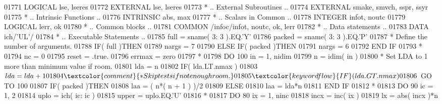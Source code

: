 \begin{DoxyCode}
01771       \textcolor{keywordtype}{LOGICAL}            lse, lseres
01772       \textcolor{keywordtype}{EXTERNAL}           lse, lseres
01773 \textcolor{comment}{*     .. External Subroutines ..}
01774       \textcolor{keywordtype}{EXTERNAL}           smake, smvch, sspr, ssyr
01775 \textcolor{comment}{*     .. Intrinsic Functions ..}
01776       \textcolor{keywordtype}{INTRINSIC}          abs, max
01777 \textcolor{comment}{*     .. Scalars in Common ..}
01778       \textcolor{keywordtype}{INTEGER}            infot, noutc
01779       \textcolor{keywordtype}{LOGICAL}            lerr, ok
01780 \textcolor{comment}{*     .. Common blocks ..}
01781       \textcolor{keyword}{COMMON}             /infoc/infot, noutc, ok, lerr
01782 \textcolor{comment}{*     .. Data statements ..}
01783       \textcolor{keyword}{DATA}               ich/\textcolor{stringliteral}{'UL'}/
01784 \textcolor{comment}{*     .. Executable Statements ..}
01785       full = sname( 3: 3 ).EQ.\textcolor{stringliteral}{'Y'}
01786       packed = sname( 3: 3 ).EQ.\textcolor{stringliteral}{'P'}
01787 \textcolor{comment}{*     Define the number of arguments.}
01788       \textcolor{keywordflow}{IF}( full )\textcolor{keywordflow}{THEN}
01789          nargs = 7
01790       \textcolor{keywordflow}{ELSE} \textcolor{keywordflow}{IF}( packed )\textcolor{keywordflow}{THEN}
01791          nargs = 6
01792 \textcolor{keywordflow}{      END IF}
01793 \textcolor{comment}{*}
01794       nc = 0
01795       reset = .true.
01796       errmax = zero
01797 \textcolor{comment}{*}
01798       \textcolor{keywordflow}{DO} 100 in = 1, nidim
01799          n = idim( in )
01800 \textcolor{comment}{*        Set LDA to 1 more than minimum value if room.}
01801          lda = n
01802          \textcolor{keywordflow}{IF}( lda.LT.nmax )
01803      $      lda = lda + 1
01804 \textcolor{comment}{*        Skip tests if not enough room.}
01805          \textcolor{keywordflow}{IF}( lda.GT.nmax )
01806      $      \textcolor{keywordflow}{GO TO} 100
01807          \textcolor{keywordflow}{IF}( packed )\textcolor{keywordflow}{THEN}
01808             laa = ( n*( n + 1 ) )/2
01809          \textcolor{keywordflow}{ELSE}
01810             laa = lda*n
01811 \textcolor{keywordflow}{         END IF}
01812 \textcolor{comment}{*}
01813          \textcolor{keywordflow}{DO} 90 ic = 1, 2
01814             uplo = ich( ic: ic )
01815             upper = uplo.EQ.\textcolor{stringliteral}{'U'}
01816 \textcolor{comment}{*}
01817             \textcolor{keywordflow}{DO} 80 ix = 1, ninc
01818                incx = inc( ix )
01819                lx = abs( incx )*n

\end{DoxyCode}
